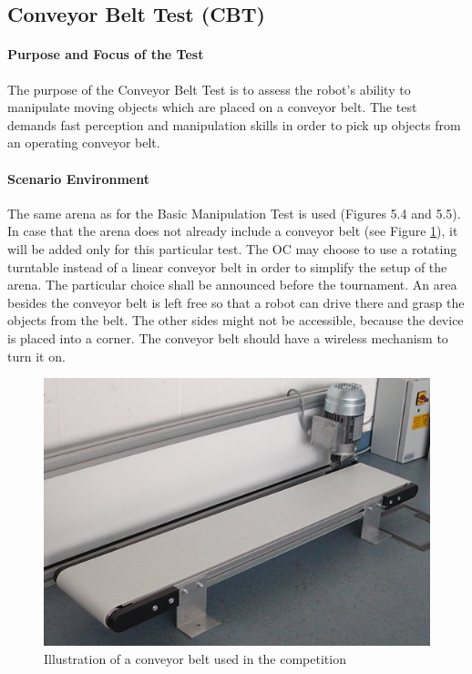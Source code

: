 \subsection{Conveyor Belt Test (CBT)}


\paragraph{Purpose and Focus of the Test}
The purpose of the Conveyor Belt Test is to assess the robot’s ability to manipulate moving objects which are placed on a conveyor belt. The test demands fast perception and manipulation skills in order to pick up objects from an operating conveyor belt.

\paragraph{Scenario Environment}
The same arena as for the Basic Manipulation Test is used (Figures 5.4 and 5.5). In case that the arena does not already include a conveyor belt (see Figure \ref{fig:conveyor_belt}), it will be added only for this particular test.
The OC may choose to use a rotating turntable instead of a linear conveyor belt in order to simplify the setup of the arena. The particular choice shall be announced before the tournament.
An area besides the conveyor belt is left free so that a robot can drive there and grasp the objects from the belt. The other sides might not be accessible, because the device is placed into a corner. 
The conveyor belt should have a wireless mechanism to turn it on. 

\begin{figure}
\includegraphics[width= \textwidth ]{../images/conveyor_belt.jpg}
\caption{Illustration of a conveyor belt used in the competition}
\label{fig:conveyor_belt}
\end{figure}


